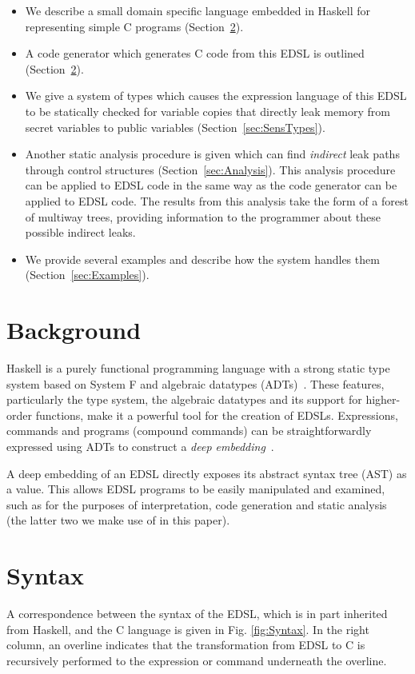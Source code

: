 \documentclass[10pt, conference]{IEEEtran}
\begin{document}
\begin{itemize}
\item We describe a small domain specific language embedded in Haskell for representing
  simple C programs (Section~\ref{sec:Syntax}).
\item A code generator which generates C code from this EDSL is outlined
  (Section~\ref{sec:Syntax}).
\item We give a system of types which causes the expression language of this
  EDSL to be statically checked for variable copies that directly leak memory
  from secret variables to public variables (Section~\ref{sec:SensTypes}).
\item Another static analysis procedure is given which can find \textit{indirect}
  leak paths through control structures (Section~\ref{sec:Analysis}). This analysis
  procedure can be applied to EDSL code in the same way as the code generator
  can be applied to EDSL code. The results from this analysis take the form
  of a forest of multiway trees, providing information to the programmer about these possible
  indirect leaks.
\item We provide several examples and describe how the system handles them
  (Section~\ref{sec:Examples}).
\end{itemize}

\section{Background}

Haskell is a purely functional programming language with a strong static type
system based on System F and algebraic datatypes (ADTs)~\cite{HistoryOfHaskell}.
These features, particularly the type system, the algebraic datatypes and its
support for higher-order functions, make it a powerful tool for the creation of
EDSLs. Expressions, commands and programs (compound commands) can be
straightforwardly expressed using ADTs to construct a \textit{deep
embedding}~\cite{DeepAndShallow}.

A deep embedding of an EDSL directly exposes its abstract syntax tree (AST) as a value.
This allows EDSL programs to be easily manipulated and examined, such as for the purposes of
interpretation, code generation and static analysis (the latter two we make use
of in this paper).

\section{Syntax}
\label{sec:Syntax}
A correspondence between the syntax of the EDSL, which is in part inherited from
Haskell, and the C language is given in Fig. \ref{fig:Syntax}. In the right column, an
overline indicates that the transformation from EDSL to C is recursively
performed to the expression or command underneath the overline.
\end{document}

